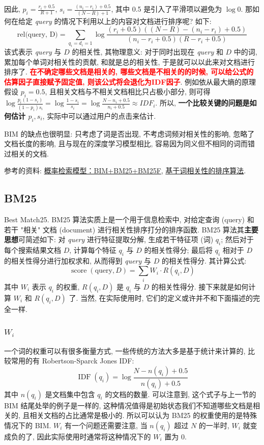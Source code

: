 因此, $p_i = \frac{r_i + 0.5}{R+1}$, $s_i = \frac{(n_i - r_i) + 0.5 }{(N - R) + 1}$, 其中 0.5 是引入了平滑项以避免为 $\log 0$. 那如何在给定 \textit{query} 的情况下利用以上的内容对文档进行排序呢? 如下:
$$
\text{rel(query, D)} = \sum_{q_{i}=d_{i}=1} \log \frac{\left(r_{i}+0.5\right)\left((N-R)-\left(n_{i}-r_{i}\right)+0.5\right)}{\left(n_{i}-r_{i}+0.5\right)\left(R-r_{i}+0.5\right)}
$$
该式表示 \textit{query} 与 $D$ 的相关性, 其物理意义: 对于同时出现在 \textit{query} 和 $D$ 中的词, 累加每个单词对相关性的贡献, 和就是总的相关性, 于是就可以以此来对文档进行排序了. \textbf{\textcolor{red}{在不确定哪些文档是相关的, 哪些文档是不相关的的时候, 可以给公式的估算因子直接赋予固定值, 则该公式将会退化为IDF因子}}. 例如依从最大熵的原理假设 $p_i = 0.5$, 且相关文档与不相关文档相比只占极小部分, 则可得 $\log \frac{p_i (1 - s_i)}{(1 - p_i) s_i} = \log \frac{1 - s_i}{s_i} = \log \frac{N - n_i + 0.5}{n_i + 0.5} \approx IDF_i$. 所以, \textbf{一个比较关键的问题是如何估计 $p_i, s_i$}, 实际中可以通过用户的点击来估计.

BIM 的缺点也很明显: 只考虑了词是否出现, 不考虑词频对相关性的影响, 忽略了文档长度的影响, 且与现在的深度学习模型相比, 容易因为同义但不相同的词而错过相关的文档.

参考的资料: \href{https://www.cnblogs.com/bentuwuying/p/6730891.html}{概率检索模型：BIM+BM25+BM25F}, \href{https://blog.csdn.net/SrdLaplace/article/details/84954920}{基于词相关性的排序算法}.

\subsection{BM25}
Best Match25. BM25 算法实质上是一个用于信息检索中, 对给定查询 (query) 和若干 "相关" 文档 (document) 进行相关性排序打分的排序函数. BM25 算法其\textbf{主要思想}可简述如下: 对 \textit{query} 进行特征提取分解, 生成若干特征项 (词) $q_i$; 然后对于每个搜索结果文档 $D$, 计算每个特征 $q_i$ 与 $D$ 的相关性得分; 最后将 $q_i$ 相对于 $D$ 的相关性得分进行加权求和, 从而得到 \textit{query} 与 $D$ 的相关性得分. 其计算公式:
$$
\operatorname{score}(\text{query}, D)=\sum_{i} W_{i} \cdot R\left(q_{i}, D\right)
$$
其中 $W_i$ 表示 $q_i$ 的权重, $R(q_i, D)$ 是 $q_i$ 与 $D$ 的相关性得分. 接下来就是如何计算 $W_i$ 和 $R(q_i, D)$ 了. 当然, 在实际使用时, 它们的定义或许并不和下面描述的完全一样.

\subsubsection{$W_i$}
一个词的权重可以有很多衡量方式, 一些传统的方法大多是基于统计来计算的, 比较常用的有 Robertson-Sparck Jones IDF:
$$
\operatorname{IDF}\left(q_{i}\right)=\log \frac{N-n\left(q_{i}\right)+0.5}{n\left(q_{i}\right)+0.5}
$$
其中 $n(q_i)$ 是文档集中包含 $q_i$ 的文档的数量. 可以注意到, 这个式子与上一节的 BIM 结尾处举的例子是一样的, 这种情况值得是初始状态我们不知道哪些文档是相关的, 且相关文档的占比通常是极小的. 所以可以认为 BM25 的权重使用的是特殊情况下的 BIM. $W_i$ 有一个问题还需要注意, 当 $n(q_i)$ 超过 $N$ 的一半时, $W_i$ 就变成负的了, 因此实际使用时通常将这种情况下的 $W_i$ 置为 0.


